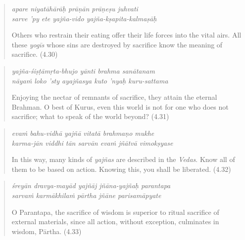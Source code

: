 \documentclass[12pt, twoside, openright]{memoir}
\begin{document}
\par
\begin{verse}
\textit{apare niyatāhārāḥ prāṇān prāṇeṣu juhvati} \\
\textit{sarve ’py ete yajña-vido yajña-kṣapita-kalmaṣāḥ}

\noindent Others who restrain their eating offer their life forces into the vital airs. All these \textit{yogīs} whose sins are destroyed by sacrifice know the meaning of sacrifice. (4.30)
\end{verse}
\par



\par
\begin{verse}
\textit{yajña-śiṣṭāmṛta-bhujo yānti brahma sanātanam} \\
\textit{nāyaṁ loko ’sty ayajñasya kuto ’nyaḥ kuru-sattama}

\noindent Enjoying the nectar of remnants of sacrifice, they attain the eternal Brahman. O best of Kurus, even this world is not for one who does not sacrifice; what to speak of the world beyond? (4.31)
\end{verse}
\par



\par
\begin{verse}
\textit{evaṁ bahu-vidhā yajñā vitatā brahmaṇo mukhe} \\
\textit{karma-jān viddhi tān sarvān evaṁ jñātvā vimokṣyase}

\noindent In this way, many kinds of \textit{yajñas} are described in the \textit{Vedas}. Know all of them to be based on action. Knowing this, you shall be liberated. (4.32)
\end{verse}
\par



\par
\begin{verse}
\textit{śreyān dravya-mayād yajñāj jñāna-yajñaḥ parantapa} \\
\textit{sarvaṁ karmākhilaṁ pārtha jñāne parisamāpyate}

\noindent O Parantapa, the sacrifice of wisdom is superior to ritual sacrifice of external materials, since all action, without exception, culminates in wisdom, Pārtha. (4.33)
\end{verse}
\par
\end{document}
